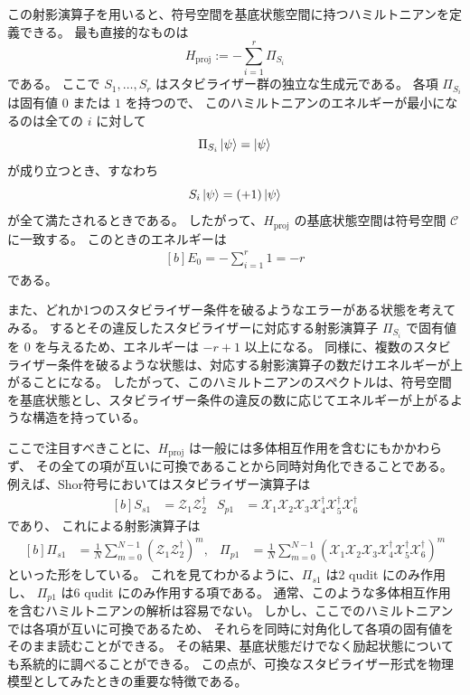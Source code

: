 \documentclass[../master.tex]{subfiles}
\begin{document}
この射影演算子を用いると、符号空間を基底状態空間に持つハミルトニアンを定義できる。
最も直接的なものは
\begin{equation}
    H_{\mathrm{proj}}:=-\sum_{i=1}^r \Pi_{S_i}
\end{equation}
である。
ここで $S_1,\dots,S_r$ はスタビライザー群の独立な生成元である。
各項 $\Pi_{S_i}$ は固有値 $0$ または $1$ を持つので、
このハミルトニアンのエネルギーが最小になるのは全ての $i$ に対して
\begin{equation}
    \Pi_{S_i}\ket{\psi}=\ket{\psi}
\end{equation}
が成り立つとき、すなわち
\begin{equation}
    S_i\ket{\psi}=(+1)\ket{\psi}
\end{equation}
が全て満たされるときである。
したがって、$H_{\mathrm{proj}}$ の基底状態空間は符号空間 $\mathcal{C}$ に一致する。
このときのエネルギーは
\begin{equation}\begin{aligned}[b]
    E_0=-\sum_{i=1}^r 1 = -r
\end{aligned}\end{equation}
である。

また、どれか1つのスタビライザー条件を破るようなエラーがある状態を考えてみる。
するとその違反したスタビライザーに対応する射影演算子 $\Pi_{S_i}$ で固有値を $0$ を与えるため、エネルギーは $-r+1$ 以上になる。
同様に、複数のスタビライザー条件を破るような状態は、対応する射影演算子の数だけエネルギーが上がることになる。
したがって、このハミルトニアンのスペクトルは、符号空間を基底状態とし、スタビライザー条件の違反の数に応じてエネルギーが上がるような構造を持っている。

ここで注目すべきことに、$H_{\mathrm{proj}}$ は一般には多体相互作用を含むにもかかわらず、
その全ての項が互いに可換であることから同時対角化できることである。
例えば、Shor符号においてはスタビライザー演算子は
\begin{equation}\begin{aligned}[b]
    S_{s1}&=\mathcal{Z}_1\mathcal{Z}_2^\dagger&
    S_{p1}&=\mathcal{X}_1\mathcal{X}_2\mathcal{X}_3 \mathcal{X}_4^\dagger\mathcal{X}_5^\dagger\mathcal{X}_6^\dagger
\end{aligned}\end{equation}
であり、
これによる射影演算子は
\begin{equation}\begin{aligned}[b]
    \Pi_{s1} &= \frac{1}{N}\sum_{m=0}^{N-1}(\mathcal{Z}_1\mathcal{Z}_2^\dagger)^m, &
    \Pi_{p1} &= \frac{1}{N}\sum_{m=0}^{N-1}(\mathcal{X}_1\mathcal{X}_2\mathcal{X}_3 \mathcal{X}_4^\dagger\mathcal{X}_5^\dagger\mathcal{X}_6^\dagger)^m
\end{aligned}\end{equation}
といった形をしている。
これを見てわかるように、$\Pi_{s1}$ は2 qudit にのみ作用し、
$\Pi_{p1}$ は6 qudit にのみ作用する項である。
通常、このような多体相互作用を含むハミルトニアンの解析は容易でない。
しかし、ここでのハミルトニアンでは各項が互いに可換であるため、
それらを同時に対角化して各項の固有値をそのまま読むことができる。
その結果、基底状態だけでなく励起状態についても系統的に調べることができる。
この点が、可換なスタビライザー形式を物理模型としてみたときの重要な特徴である。
\end{document}
